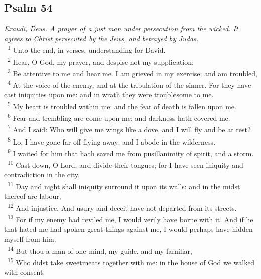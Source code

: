 \documentclass[a5paper,12pt]{article}
\begin{document}
\begin{multicols*}{2}
\section{Psalm 54}
\label{sec:org3b2b9e4}
\emph{Exaudi, Deus. A prayer of a just man under persecution from the wicked. It agrees to Christ persecuted by the Jews, and betrayed by Judas.}\\

~\textsuperscript{1} Unto the end, in verses, understanding for David.\\
~\textsuperscript{2} Hear, O God, my prayer, and despise not my supplication:\\
~\textsuperscript{3} Be attentive to me and hear me. I am grieved in my exercise; and am troubled,\\
~\textsuperscript{4} At the voice of the enemy, and at the tribulation of the sinner. For they have cast iniquities upon me: and in wrath they were troublesome to me.\\
~\textsuperscript{5} My heart is troubled within me: and the fear of death is fallen upon me.\\
~\textsuperscript{6} Fear and trembling are come upon me: and darkness hath covered me.\\
~\textsuperscript{7} And I said: Who will give me wings like a dove, and I will fly and be at rest?\\
~\textsuperscript{8} Lo, I have gone far off flying away; and I abode in the wilderness.\\
~\textsuperscript{9} I waited for him that hath saved me from pusillanimity of spirit, and a storm.\\
~\textsuperscript{10} Cast down, O Lord, and divide their tongues; for I have seen iniquity and contradiction in the city.\\
~\textsuperscript{11} Day and night shall iniquity surround it upon its walls: and in the midst thereof are labour,\\
~\textsuperscript{12} And injustice. And usury and deceit have not departed from its streets.\\
~\textsuperscript{13} For if my enemy had reviled me, I would verily have borne with it. And if he that hated me had spoken great things against me, I would perhaps have hidden myself from him.\\
~\textsuperscript{14} But thou a man of one mind, my guide, and my familiar,\\
~\textsuperscript{15} Who didst take sweetmeats together with me: in the house of God we walked with consent.\\

\end{multicols*}
\end{document}
